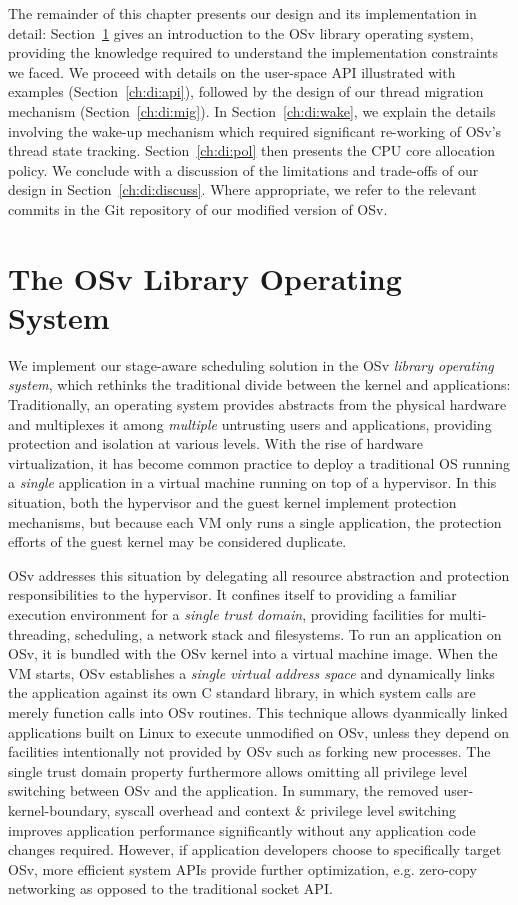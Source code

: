 \documentclass[12pt,a4paper]{book}
\begin{document}
The remainder of this chapter presents our design and its implementation in detail:
Section~\ref{ch:di:osv} gives an introduction to the OSv library operating system, providing the knowledge required to understand the implementation constraints we faced.
We proceed with details on the user-space API illustrated with examples (Section~\ref{ch:di:api}), followed by the design of our thread migration mechanism (Section~\ref{ch:di:mig}).
In Section~\ref{ch:di:wake}, we explain the details involving the wake-up mechanism which required significant re-working of OSv's thread state tracking.
Section~\ref{ch:di:pol} then presents the CPU core allocation policy.
We conclude with a discussion of the limitations and trade-offs of our design in Section~\ref{ch:di:discuss}.
Where appropriate, we refer to the relevant commits in the Git repository of our modified version of OSv.

\section{The OSv Library Operating System}\label{ch:di:osv}
We implement our stage-aware scheduling solution in the OSv \emph{library operating system}, which rethinks the traditional divide between the kernel and applications:
Traditionally, an operating system provides abstracts from the physical hardware and multiplexes it among \emph{multiple} untrusting users and applications, providing protection and isolation at various levels.
With the rise of hardware virtualization, it has become common practice to deploy a traditional OS running a \emph{single} application in a virtual machine running on top of a hypervisor.
In this situation, both the hypervisor and the guest kernel implement protection mechanisms, but because each VM only runs a single application, the protection efforts of the guest kernel may be considered duplicate.~\cite{mirageOS,osvMain}

OSv addresses this situation by delegating all resource abstraction and protection responsibilities to the hypervisor.
It confines itself to providing a familiar execution environment for a \emph{single trust domain}, providing facilities for multi-threading, scheduling, a network stack and filesystems.
To run an application on OSv, it is bundled with the OSv kernel into a virtual machine image.
When the VM starts, OSv establishes a \emph{single virtual address space} and dynamically links the application against its own C standard library, in which system calls are merely function calls into OSv routines.
This technique allows dyanmically linked applications built on Linux to execute unmodified on OSv, unless they depend on facilities intentionally not provided by OSv such as forking new processes.
The single trust domain property furthermore allows omitting all privilege level switching between OSv and the application.
In summary, the removed user-kernel-boundary, syscall overhead and context \& privilege level switching improves application performance significantly without any application code changes required.
However, if application developers choose to specifically target OSv, more efficient system APIs provide further optimization, e.g. zero-copy networking as opposed to the traditional socket API.~\cite{osvMain}
\end{document}
